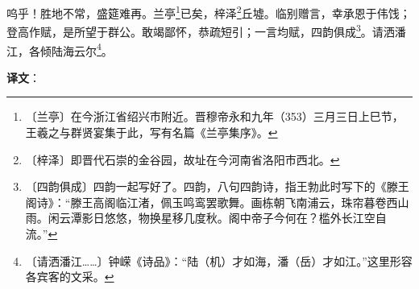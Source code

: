 \documentclass[12pt,UTF-8,openany]{ctexbook}
\begin{document}
\begin{normalsize}
    呜乎！胜地不常，盛筵难再。兰亭\footnote{〔兰亭〕在今浙江省绍兴市附近。晋穆帝永和九年（353）三月三日上巳节，王羲之与群贤宴集于此，写有名篇《兰亭集序》。}已矣，梓泽\footnote{〔梓泽〕即晋代石崇的金谷园，故址在今河南省洛阳市西北。}丘墟。临别赠言，幸承恩于伟饯；登高作赋，是所望于群公。敢竭鄙怀，恭疏短引；一言均赋，四韵俱成\footnote{〔四韵俱成〕四韵一起写好了。四韵，八句四韵诗，指王勃此时写下的《滕王阁诗》：“滕王高阁临江渚，佩玉鸣鸾罢歌舞。画栋朝飞南浦云，珠帘暮卷西山雨。闲云潭影日悠悠，物换星移几度秋。阁中帝子今何在？槛外长江空自流。”}。请洒潘江，各倾陆海云尔\footnote{〔请洒潘江……〕钟嵘《诗品》：“陆（机）才如海，潘（岳）才如江。”这里形容各宾客的文采。}。
\end{normalsize}


\newpage

\textbf{译文}：

\vspace{1em}
\end{document}
